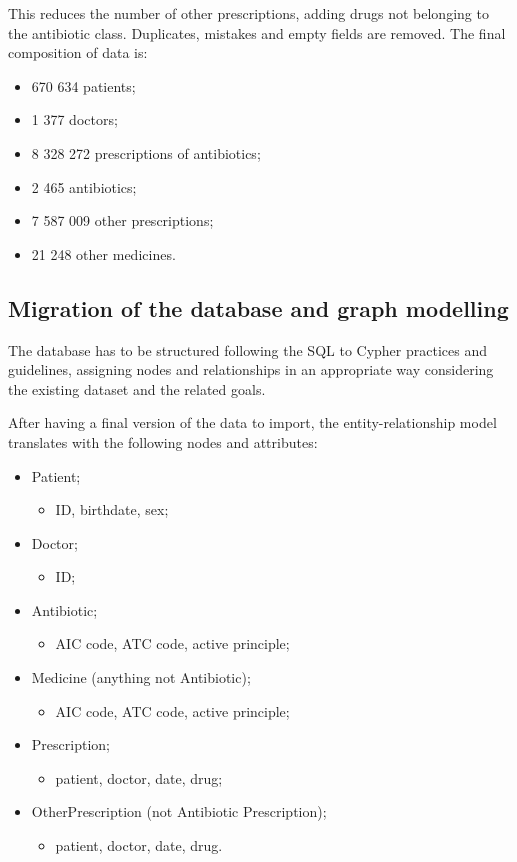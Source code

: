This reduces the number of other prescriptions, adding drugs not belonging to the antibiotic class. Duplicates, mistakes and empty fields are removed. The final composition of data is:

\begin{itemize}
	\item 670 634 patients;
	\item 1 377 doctors;
	\item 8 328 272 prescriptions of antibiotics;
	\item 2 465 antibiotics;
	\item 7 587 009 other prescriptions;
	\item 21 248 other medicines.
\end{itemize}


\subsection{Migration of the database and graph modelling}
The database has to be structured following the SQL to Cypher practices and guidelines, assigning nodes and relationships in an appropriate way considering the existing dataset and the related goals.

After having a final version of the data to import, the entity-relationship model translates with the following nodes and attributes:
\begin{itemize}
	\item Patient;
	\begin{itemize}
		\item ID, birthdate, sex;
	\end{itemize}
	\item Doctor;
	\begin{itemize}
		\item ID; 
	\end{itemize}
	\item Antibiotic;
	\begin{itemize}
		\item AIC code, ATC code, active principle;
	\end{itemize}
	\item Medicine (anything not Antibiotic);
	\begin{itemize}
		\item AIC code, ATC code, active principle;
	\end{itemize}
	\item Prescription;
	\begin{itemize}
		\item patient, doctor, date, drug;
	\end{itemize}
	\item OtherPrescription (not Antibiotic Prescription);
	\begin{itemize}
		\item patient, doctor, date, drug.
	\end{itemize}
\end{itemize}

